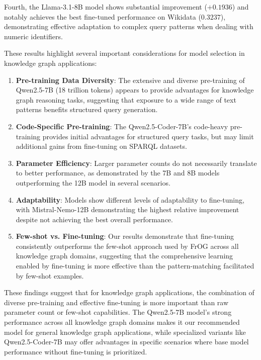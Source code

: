 Fourth, the Llama-3.1-8B model shows substantial improvement ($+0.1936$) and notably achieves the best fine-tuned performance on Wikidata ($0.3237$), demonstrating effective adaptation to complex query patterns when dealing with numeric identifiers.

These results highlight several important considerations for model selection in knowledge graph applications:

\begin{enumerate}
    \item \textbf{Pre-training Data Diversity}: The extensive and diverse pre-training of Qwen2.5-7B (18 trillion tokens) appears to provide advantages for knowledge graph reasoning tasks, suggesting that exposure to a wide range of text patterns benefits structured query generation.
    
    \item \textbf{Code-Specific Pre-training}: The Qwen2.5-Coder-7B's code-heavy pre-training provides initial advantages for structured query tasks, but may limit additional gains from fine-tuning on SPARQL datasets.
    
    \item \textbf{Parameter Efficiency}: Larger parameter counts do not necessarily translate to better performance, as demonstrated by the 7B and 8B models outperforming the 12B model in several scenarios.
    
    \item \textbf{Adaptability}: Models show different levels of adaptability to fine-tuning, with Mistral-Nemo-12B demonstrating the highest relative improvement despite not achieving the best overall performance.
    
    \item \textbf{Few-shot vs. Fine-tuning}: Our results demonstrate that fine-tuning consistently outperforms the few-shot approach used by FrOG across all knowledge graph domains, suggesting that the comprehensive learning enabled by fine-tuning is more effective than the pattern-matching facilitated by few-shot examples.
\end{enumerate}

These findings suggest that for knowledge graph applications, the combination of diverse pre-training and effective fine-tuning is more important than raw parameter count or few-shot capabilities. The Qwen2.5-7B model's strong performance across all knowledge graph domains makes it our recommended model for general knowledge graph applications, while specialized variants like Qwen2.5-Coder-7B may offer advantages in specific scenarios where base model performance without fine-tuning is prioritized.

